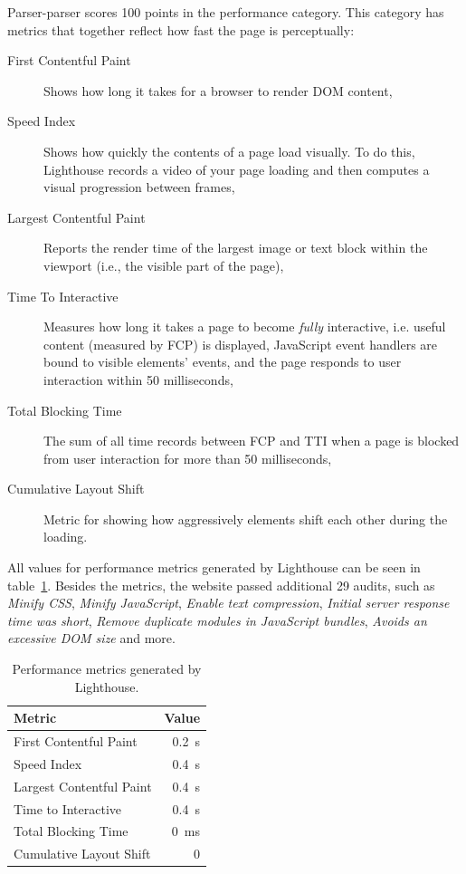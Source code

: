 \documentclass[english,engineering]{wizthesis}
\newcommand{\thisproject}{Parser-parser}
\begin{document}
\thisproject{} scores 100 points in the performance category. This category has
metrics that together reflect how fast the page is perceptually:
\begin{description}
  \item[First Contentful Paint] Shows how long it takes for a browser to render
  DOM content,
  \item[Speed Index] Shows how quickly the contents of a page load visually. To
  do this, Lighthouse records a video of your page loading and then computes a
  visual progression between frames,
  \item[Largest Contentful Paint] Reports the render time of the largest image
  or text block within the viewport (i.e., the visible part of the page),
  \item[Time To Interactive] Measures how long it takes a page to become
  \emph{fully} interactive, i.e. useful content (measured by FCP) is displayed,
  JavaScript event handlers are bound to visible elements' events, and the page
  responds to user interaction within 50 milliseconds,
  \item[Total Blocking Time] The sum of all time records between FCP and TTI
  when a page is blocked from user interaction for more than 50 milliseconds,
  \item[Cumulative Layout Shift] Metric for showing how aggressively elements
  shift each other during the loading.
\end{description}
All values for performance metrics generated by Lighthouse can be seen in
table~\ref{tab:lighthouse-performance-metrics}. Besides the metrics, the website
passed additional 29 audits, such as \emph{Minify CSS}, \emph{Minify
JavaScript}, \emph{Enable text compression}, \emph{Initial server response time
was short}, \emph{Remove duplicate modules in JavaScript bundles}, \emph{Avoids
an excessive DOM size} and more.
\begin{table}[H]
  \centering
  \caption{Performance metrics generated by Lighthouse.}
  \label{tab:lighthouse-performance-metrics}
  \begin{tabular}{@{}lr@{}}
    \toprule
    Metric                   & Value                 \\ \midrule
    First Contentful Paint   & \SI{0.2}{\second}     \\
    Speed Index              & \SI{0.4}{\second}     \\
    Largest Contentful Paint & \SI{0.4}{\second}     \\
    Time to Interactive      & \SI{0.4}{\second}     \\
    Total Blocking Time      & \SI{0}{\milli\second} \\
    Cumulative Layout Shift  & 0                     \\ \bottomrule
  \end{tabular}
\end{table}
\end{document}
